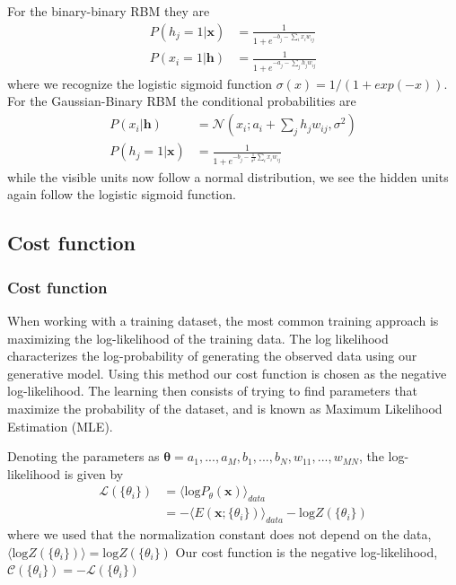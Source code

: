 \documentclass[norsk,a4paper,11pt]{beamer}
\begin{document}
\begin{frame}
For the binary-binary RBM they are
\begin{align}
	P(h_j = 1 | \bm{x}) &= \frac{1}{1 + e^{-b_j - \sum_i x_i w_{ij}}} \\
	P(x_i = 1 | \bm{h}) &= \frac{1}{1 + e^{-a_j - \sum_j h_j w_{ij}}}
\end{align}
where we recognize the logistic sigmoid function $\sigma (x) = 1/(1+exp(-x))$.
For the Gaussian-Binary RBM the conditional probabilities are
\begin{align}
	P(x_i|\mathbf{h}) &= \mathcal{N}(x_i; a_i+ \sum_j h_j w_{ij}, \sigma^2) \\
	P(h_j=1|\mathbf{x}) &=  \frac{1}{1+e^{-b_j-\frac{1}{\sigma^2} \sum_i x_i w_{ij}}}
\end{align}
while the visible units now follow a normal distribution, we see the hidden units again follow the logistic sigmoid function.
\end{frame}

\subsection{Cost function}
\begin{frame}
\frametitle{Cost function}
When working with a training dataset, the most common training approach is maximizing the log-likelihood of the training data. The log likelihood characterizes the log-probability of generating the observed data using our generative model. Using this method our cost function is chosen as the negative log-likelihood. The learning then consists of trying to find parameters that maximize the probability of the dataset, and is known as Maximum Likelihood Estimation (MLE).
\end{frame}

\begin{frame}
Denoting the parameters as $\bm{\theta} = a_1,...,a_M,b_1,...,b_N,w_{11},...,w_{MN}$, the log-likelihood is given by
\begin{align}
	\mathcal{L}(\{ \theta_i \}) &= \langle \text{log} P_\theta(\bm{x}) \rangle_{data} \\
	&= - \langle E(\bm{x}; \{ \theta_i\}) \rangle_{data} - \text{log} Z(\{ \theta_i\})
\end{align}
where we used that the normalization constant does not depend on the data, $\langle \text{log} Z(\{ \theta_i\}) \rangle = \text{log} Z(\{ \theta_i\})$
Our cost function is the negative log-likelihood, $\mathcal{C}(\{ \theta_i \}) = - \mathcal{L}(\{ \theta_i \})$
\end{frame}
\end{document}
